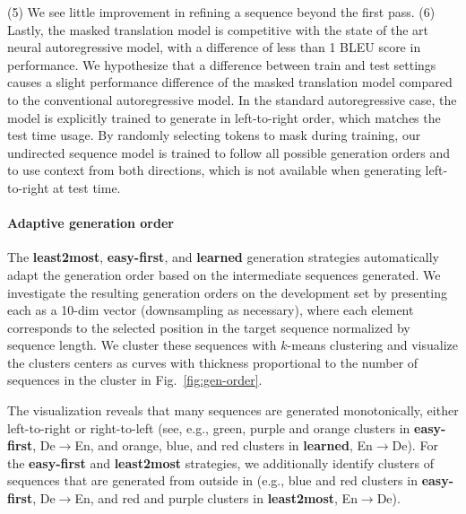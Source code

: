 \documentclass{article}
\begin{document}
(5) We see little improvement in refining a sequence beyond the first pass.
(6) Lastly, the masked translation model is competitive with the state of the art neural autoregressive model, with a difference of less than 1 BLEU score in performance. We hypothesize that a difference between train and test settings causes a slight performance difference of the masked translation model compared to the conventional autoregressive model. In the standard autoregressive case, the model is explicitly trained to generate in left-to-right order, which matches the test time usage.  By randomly selecting tokens to mask during training, our undirected sequence model is trained to follow all possible generation orders and to use context from both directions, which is not available when generating left-to-right at test time.

\paragraph{Adaptive generation order}

\begin{table*}[t]
    
	\label{tab:faster_decoding}
\end{table*} 
The {\bf least2most}, {\bf easy-first}, and {\bf learned} generation strategies automatically adapt the generation order based on the intermediate sequences generated. 
We investigate the resulting generation orders on the development set by presenting each as a 10-dim vector (downsampling as necessary), where each element corresponds to the selected position in the target sequence normalized by sequence length. We cluster these sequences with $k$-means clustering and visualize the clusters centers as curves with thickness proportional to the number of sequences in the cluster in Fig.~\ref{fig:gen-order}.  

The visualization reveals that many sequences are generated monotonically, either left-to-right or right-to-left (see, e.g., {\color{green} green}, {\color{violet} purple} and {\color{orange} orange} clusters in {\bf easy-first}, De$\to$En, and {\color{orange} orange}, {\color{blue} blue}, and {\color{red} red} clusters in {\bf learned}, En$\to$De).
For the \textbf{easy-first} and \textbf{least2most} strategies, we additionally identify clusters of sequences that are generated from outside in (e.g., {\color{blue} blue} and {\color{red} red} clusters in {\bf easy-first}, De$\to$En, and {\color{red} red} and {\color{violet} purple} clusters in {\bf least2most}, En$\to$De). %
\end{document}

